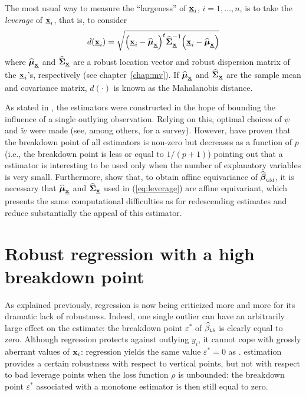 The most usual way to measure the “largeness” of $\underline{\mathbf x}_{i}$,
$i=1, \dots, n$, is to take the \emph{leverage} of $\underline{\mathbf x}_{i}$,
that is, to consider
%
\begin{equation}
    \label{eq:leverage}
    d(\underline{\stvec{x}}_{i}) = 
    \sqrt{\left(\underline{\stvec{x}}_{i} - \sthat{\boldsymbol\mu}_{\underline{\stvec{x}}}\right)^t
    \sthat{\boldsymbol\Sigma}_{\underline{\stvec{x}}}^{-1}
    \left(\underline{\stvec{x}}_{i} - \sthat{\boldsymbol\mu}_{\underline{\stvec{x}}}\right)}
\end{equation}
%
where $\widehat{\boldsymbol\mu}_{\underline{\mathbf x}}$ and
$\widehat{\boldsymbol\Sigma}_{\underline{\mathbf x}}$ are a robust location
vector and robust dispersion matrix of the $\underline{\mathbf x}_{i}$'s,
respectively (see chapter~\ref{chap:mv}). If
$\widehat{\boldsymbol\mu}_{\underline{\mathbf x}}$ and
$\widehat{\boldsymbol\Sigma}_{\underline{\mathbf x}}$ are the sample mean and
covariance matrix, $d(\cdot)$ is known as the Mahalanobis distance.

As stated in \citet{rousseeuw:leroy:1987}, the  estimators were
constructed in the hope of bounding the influence of a single outlying
observation. Relying on this, optimal choices of $\psi$ and $\widetilde{w}$
were made (see, among others, \citealp{Ronchetti:Rousseeuw:1985} for a survey).
However, \citet{Maronna:1979} have proven that the breakdown point of all
 estimators is non-zero but decreases as a function of $p$ (i.e., the
breakdown point is less or equal to $1/(p+1)$) pointing out that a
 estimator is interesting to be used only when the number of
explanatory variables is very small. Furthermore, \citet{maronna:etal:2006}
show that, to obtain affine equivariance of
$\sthat{\boldsymbol\beta}_{\stsc{GM}}$, it is necessary that
$\widehat{\boldsymbol\mu}_{\underline{\mathbf x}}$ and
$\widehat{\boldsymbol\Sigma}_{\underline{\mathbf x}}$ used in (\ref{eq:leverage})
are affine equivariant, which presents the same computational difficulties as
for redescending  estimates and reduce substantially the appeal of this
estimator.

\section{Robust regression with a high breakdown point}

As explained previously,  regression is now being criticized more and
more for its dramatic lack of robustness. Indeed, one single outlier can have
an arbitrarily large effect on the estimate: the breakdown point
$\varepsilon^*$ of $\sthat{\beta}_{\stsc{LS}}$ is clearly equal to zero.
Although  regression protects against outlying $y_{i}$, it cannot
cope with grossly aberrant values of $\mathbf x_{i}$:  regression
yields the same value $\varepsilon^*=0$ as .  estimation
provides a certain robustness with respect to vertical points, but not with
respect to bad leverage points when the loss function $\rho$ is unbounded: the
breakdown point $\varepsilon^*$ associated with a monotone  estimator
is then still equal to zero.

